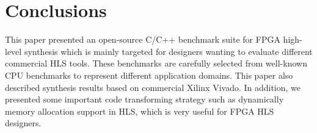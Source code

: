 \documentclass[conference]{IEEEtran}
\begin{document}
\section{Conclusions}\label{section_conclusions}
This paper presented an open-source C/C++ benchmark suite  for  FPGA high-level synthesis which is mainly targeted for designers wanting to evaluate different commercial HLS tools. These benchmarks are carefully selected from well-known  CPU benchmarks to represent different application domains. This paper also described synthesis results based on commercial Xilinx Vivado. In addition, we presented some important code transforming strategy such as dynamically memory allocation support in HLS, which is very useful for FPGA HLS designers.

%
%



%
%
\end{document}
